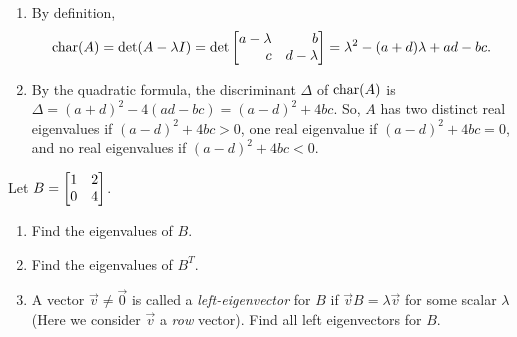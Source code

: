 \begin{exercises}
\begin{problist}
		\begin{solution}
		    \begin{enumerate}
		        \item  By definition,
        		\begin{align*}
        		    \Char(A) = \det (A - \lambda I) = \det \mat{a - \lambda & b \\ c & d - \lambda} = \lambda^2 - (a + d)\lambda + ad - bc.
        		\end{align*}
        		\item By the quadratic formula, the discriminant $\Delta$ of $\operatorname{char}(A)$ is $\Delta = (a + d)^2 - 4(ad - bc) = (a - d)^2  + 4 bc$. So, $A$ has two distinct real eigenvalues if $(a - d)^2 + 4bc > 0$, one real eigenvalue if $(a - d)^2 + 4bc = 0$, and no real eigenvalues if $(a - d)^2 + 4bc < 0.$
		    \end{enumerate}
		\end{solution}

		\prob Let $B=\mat{1&2\\0&4}$.
		\begin{enumerate}
			\item Find the eigenvalues of $B$.
			\item Find the eigenvalues of $B^T$.
			\item A vector $\vec v\neq\vec 0$ is called a \emph{left-eigenvector} for $B$ if
				$\vec vB=\lambda \vec v$ for some scalar $\lambda$ (Here we consider $\vec v$ a \emph{row} vector). Find all
				left eigenvectors for $B$.
		\end{enumerate}
		

\end{problist}
\end{exercises}
